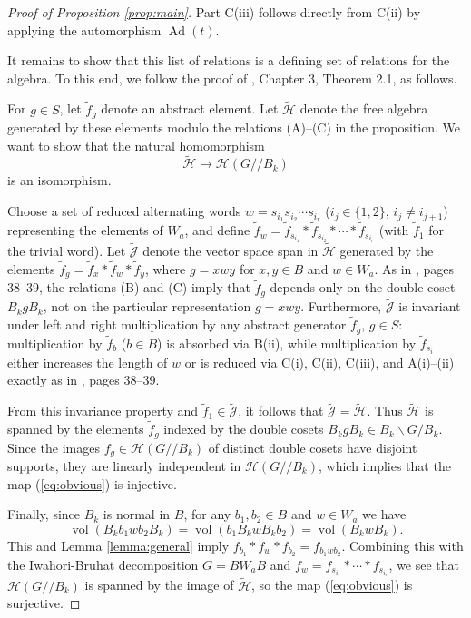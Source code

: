 \documentclass[12pt,letterpaper,reqno]{amsart}
\let\cal\mathcal
\theoremstyle{definition}
\theoremstyle{remark}
\numberwithin{equation}{section}
\begin{document}
\begin{proof}[Proof of Proposition \ref{prop:main}]
Part C(iii) follows directly from C(ii) by applying the automorphism
$\operatorname{Ad}(t)$.

It remains to show that this list of relations is a defining set of relations
for the algebra. To this end, we follow the proof of \cite{HM85}, Chapter 3,
Theorem 2.1, as follows.

For $g\in S$, let $\tilde{f}_g$ denote an abstract element. Let
$\tilde{\cal H}$ denote the free algebra generated by these elements modulo
the relations (A)--(C) in the proposition. We want to show that the natural
homomorphism
\begin{equation}
\label{eq:obvious}
\tilde{\cal H}\longrightarrow {\cal H}(G//B_k)
\end{equation}
is an isomorphism.

Choose a set of reduced alternating words $w=s_{i_1}s_{i_2}\cdots s_{i_r}$
($i_j\in\{1,2\}$, $i_j\neq i_{j+1}$) representing the elements of $W_a$, and
define $\tilde{f}_w=\tilde{f}_{s_{i_1}}*\tilde{f}_{s_{i_2}}*\cdots
*\tilde{f}_{s_{i_r}}$ (with $\tilde{f}_1$ for the trivial word). Let
$\tilde{\cal J}$ denote the vector space span in $\tilde{\cal H}$ generated by
the elements $\tilde{f}_g=\tilde{f}_x*\tilde{f}_w*\tilde{f}_y$, where $g=xwy$
for $x,y\in B$ and $w\in W_a$. As in \cite{HM85}, pages 38--39, the relations (B)
and (C) imply that $\tilde{f}_g$ depends only on the double coset $B_kgB_k$,
not on the particular representation $g=xwy$. Furthermore, $\tilde{\cal J}$ is
invariant under left and right multiplication by any abstract generator
$\tilde{f}_g$, $g\in S$: multiplication by $\tilde{f}_b$ ($b\in B$) is absorbed
via B(ii), while multiplication by $\tilde{f}_{s_i}$ either increases the
length of $w$ or is reduced via C(i), C(ii), C(iii), and A(i)--(ii) exactly as
in \cite{HM85}, pages 38--39.

From this invariance property and $\tilde{f}_1\in\tilde{\cal J}$, it follows
that $\tilde{\cal J}=\tilde{\cal H}$. Thus $\tilde{\cal H}$ is spanned by the
elements $\tilde{f}_g$ indexed by the double cosets $B_kgB_k\in B_k\backslash G/B_k$.
Since the images $f_g\in {\cal H}(G//B_k)$ of distinct double cosets have
disjoint supports, they are linearly independent in ${\cal H}(G//B_k)$, which
implies that the map (\ref{eq:obvious}) is injective.

Finally, since $B_k$ is normal in $B$, for any $b_1,b_2\in B$ and $w\in W_a$
we have
\[
\operatorname{vol}(B_k b_1 w b_2 B_k)
=\operatorname{vol}(b_1 B_k w B_k b_2)
=\operatorname{vol}(B_k w B_k).
\]
This and Lemma \ref{lemma:general} imply
$f_{b_1}*f_w*f_{b_2}=f_{b_1wb_2}$. Combining this with the Iwahori-Bruhat
decomposition $G=BW_aB$ and $f_w=f_{s_{i_1}}*\cdots *f_{s_{i_r}}$, we see
that ${\cal H}(G//B_k)$ is spanned by the image of $\tilde{\cal H}$, so the
map (\ref{eq:obvious}) is surjective.
\end{proof}
\end{document}

